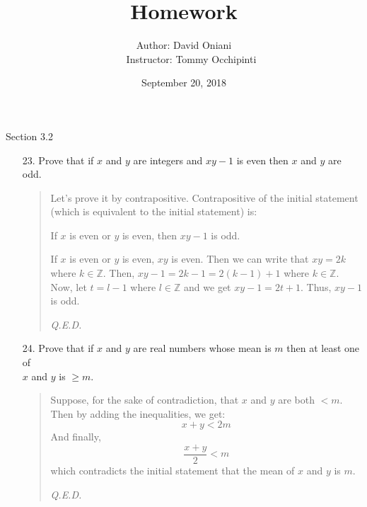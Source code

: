 \documentclass[12pt, a4paper]{article}                      %
\title{\bf{Homework \textnumero 4}}
\author{Author: David Oniani
\\
\ \ \ Instructor: Tommy Occhipinti}
\date{September 20, 2018}
\begin{document}
\maketitle

{\large Section 3.2}
\\

\begin{enumerate}
\item[23.]
Prove that if $x$ and $y$ are integers and $xy - 1$ is even then $x$ and $y$ are odd.
\begin{quote}
Let's prove it by contrapositive. Contrapositive of the initial statement (which is equivalent to the initial statement) is:
\begin{center}
If $x$ is even or $y$ is even, then $xy - 1$ is odd.
\end{center}
If $x$ is even or $y$ is even, $xy$ is even. Then we can write that $xy = 2k$ where $k \in \mathbb{Z}$.
Then, $xy - 1 = 2k - 1 = 2(k - 1) + 1$ where $k \in \mathbb{Z}$. Now, let $t = l - 1$ where $l \in \mathbb{Z}$
and we get $xy - 1 = 2t + 1$. Thus, $xy - 1$ is odd.
\begin{flushright}
\textit{Q.E.D.}
\end{flushright}
\end{quote}

\item[24.]
Prove that if $x$ and $y$ are real numbers whose mean is $m$ then at least one of\\
$x$ and $y$ is $\geq m$.
\begin{quote}
Suppose, for the sake of contradiction, that $x$ and $y$ are both $< m$.
Then by adding the inequalities, we get:
$$
x + y < 2m
$$
And finally,
$$
\dfrac{x + y}{2} < m
$$
which contradicts the initial statement that the mean of $x$ and $y$ is $m$.
\begin{flushright}
\textit{Q.E.D.}
\end{flushright}
\end{quote}


\end{enumerate}
\end{document}
